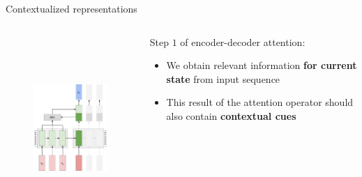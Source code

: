 \documentclass[12pt,aspectratio=169,handout]{beamer}
\begin{document}
\begin{frame}{Contextualized representations}

	\begin{columns}[T] %
	
		\begin{column}{.48\textwidth}
	
		\begin{figure}[h]
			\includegraphics[height=7cm]{seq2seq_attention_t1.pdf}
		\end{figure}
		\end{column}
	
		\begin{column}{.48\textwidth}
			Step $1$ of encoder-decoder attention:
			\pause
			\begin{itemize}
				\item We obtain relevant information \textbf{for current state} from input sequence
				\pause
				\item This result of the attention operator should also contain \textbf{contextual cues}
			\end{itemize}
		\end{column}
	
	\end{columns}
	
\end{frame}
\end{document}

